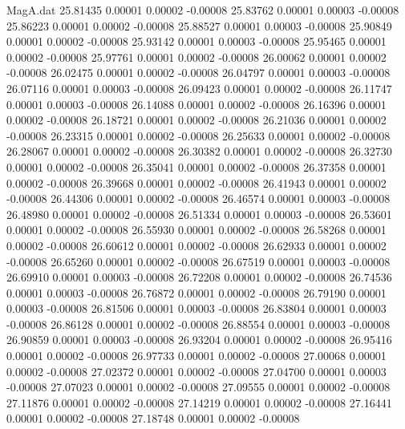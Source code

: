 \begin{filecontents}{MagA.dat}
  25.81435    0.00001    0.00002   -0.00008
  25.83762    0.00001    0.00003   -0.00008
  25.86223    0.00001    0.00002   -0.00008
  25.88527    0.00001    0.00003   -0.00008
  25.90849    0.00001    0.00002   -0.00008
  25.93142    0.00001    0.00003   -0.00008
  25.95465    0.00001    0.00002   -0.00008
  25.97761    0.00001    0.00002   -0.00008
  26.00062    0.00001    0.00002   -0.00008
  26.02475    0.00001    0.00002   -0.00008
  26.04797    0.00001    0.00003   -0.00008
  26.07116    0.00001    0.00003   -0.00008
  26.09423    0.00001    0.00002   -0.00008
  26.11747    0.00001    0.00003   -0.00008
  26.14088    0.00001    0.00002   -0.00008
  26.16396    0.00001    0.00002   -0.00008
  26.18721    0.00001    0.00002   -0.00008
  26.21036    0.00001    0.00002   -0.00008
  26.23315    0.00001    0.00002   -0.00008
  26.25633    0.00001    0.00002   -0.00008
  26.28067    0.00001    0.00002   -0.00008
  26.30382    0.00001    0.00002   -0.00008
  26.32730    0.00001    0.00002   -0.00008
  26.35041    0.00001    0.00002   -0.00008
  26.37358    0.00001    0.00002   -0.00008
  26.39668    0.00001    0.00002   -0.00008
  26.41943    0.00001    0.00002   -0.00008
  26.44306    0.00001    0.00002   -0.00008
  26.46574    0.00001    0.00003   -0.00008
  26.48980    0.00001    0.00002   -0.00008
  26.51334    0.00001    0.00003   -0.00008
  26.53601    0.00001    0.00002   -0.00008
  26.55930    0.00001    0.00002   -0.00008
  26.58268    0.00001    0.00002   -0.00008
  26.60612    0.00001    0.00002   -0.00008
  26.62933    0.00001    0.00002   -0.00008
  26.65260    0.00001    0.00002   -0.00008
  26.67519    0.00001    0.00003   -0.00008
  26.69910    0.00001    0.00003   -0.00008
  26.72208    0.00001    0.00002   -0.00008
  26.74536    0.00001    0.00003   -0.00008
  26.76872    0.00001    0.00002   -0.00008
  26.79190    0.00001    0.00003   -0.00008
  26.81506    0.00001    0.00003   -0.00008
  26.83804    0.00001    0.00003   -0.00008
  26.86128    0.00001    0.00002   -0.00008
  26.88554    0.00001    0.00003   -0.00008
  26.90859    0.00001    0.00003   -0.00008
  26.93204    0.00001    0.00002   -0.00008
  26.95416    0.00001    0.00002   -0.00008
  26.97733    0.00001    0.00002   -0.00008
  27.00068    0.00001    0.00002   -0.00008
  27.02372    0.00001    0.00002   -0.00008
  27.04700    0.00001    0.00003   -0.00008
  27.07023    0.00001    0.00002   -0.00008
  27.09555    0.00001    0.00002   -0.00008
  27.11876    0.00001    0.00002   -0.00008
  27.14219    0.00001    0.00002   -0.00008
  27.16441    0.00001    0.00002   -0.00008
  27.18748    0.00001    0.00002   -0.00008

\end{filecontents}
